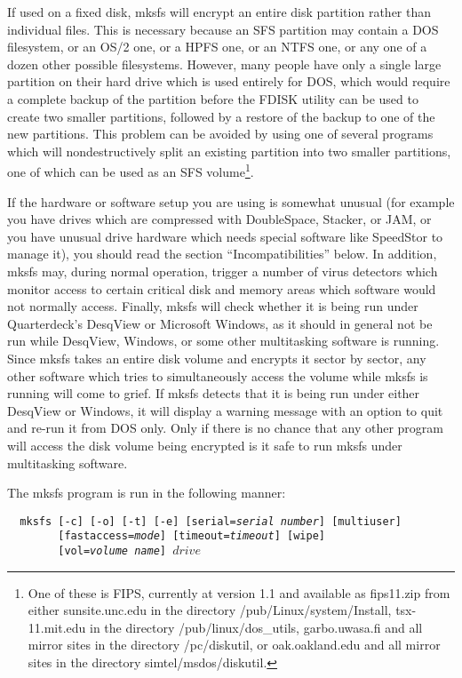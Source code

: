 If used on a fixed disk, mksfs will encrypt an entire disk partition rather
than individual files.  This is necessary because an SFS partition may contain
a DOS filesystem, or an OS/2 one, or a HPFS one, or an NTFS one, or any one of
a dozen other possible filesystems.  However, many people have only a single
large partition on their hard drive which is used entirely for DOS, which would
require a complete backup of the partition before the FDISK utility can be used
to create two smaller partitions, followed by a restore of the backup to one of
the new partitions.  This problem can be avoided by using one of several
programs which will nondestructively split an existing partition into two 
smaller partitions, one of which can be used as an SFS volume\footnote{
		One of these is FIPS, currently at version 1.1 and available as
             	fips11.zip from either sunsite.unc.edu in the directory
              	/pub/Linux/system/Install, tsx-11.mit.edu in the directory
              	/pub/linux/dos\_utils, garbo.uwasa.fi and all mirror sites in the
                directory /pc/diskutil, or oak.oakland.edu and all mirror sites
                in the directory simtel/msdos/diskutil.
}.

If the hardware or software setup you are using is somewhat unusual (for
example you have drives which are compressed with DoubleSpace, Stacker, or JAM,
or you have unusual drive hardware which needs special software like SpeedStor 
to manage it), you should read the section ``Incompatibilities'' below.  In
addition, mksfs may, during normal operation, trigger a number of virus
detectors which monitor access to certain critical disk and memory areas which
software would not normally access.  Finally, mksfs will check whether it is
being run under Quarterdeck's DesqView or Microsoft Windows, as it should in
general not be run while DesqView, Windows, or some other multitasking software
is running.  Since mksfs takes an entire disk volume and encrypts it sector by
sector, any other software which tries to simultaneously access the volume
while mksfs is running will come to grief.  If mksfs detects that it is being
run under either DesqView or Windows, it will display a warning message with an
option to quit and re-run it from DOS only.  Only if there is no chance that
any other program will access the disk volume being encrypted is it safe to run
mksfs under multitasking software.

The mksfs program is run in the following manner:

{\tt \verb|  |mksfs [-c] [-o] [-t] [-e] [serial={\em serial number}] [multiuser]\\
\verb|        |[fastaccess={\em mode}] [timeout={\em timeout}] [wipe]\\
\verb|        |[vol={\em volume name}] $drive$}

